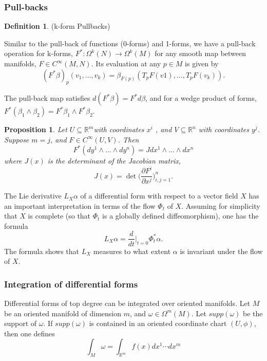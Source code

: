 \documentclass{article}
\newtheorem{proposition}{Proposition}[theorem]
\theoremstyle{definition}
\newtheorem{defn}[theorem]{Definition}
\newenvironment{definition}
  {\vspace{8pt}\begin{mdframed}[backgroundcolor=blueish]\begin{defn}}
  {\end{defn}\end{mdframed}\vspace{4pt}}
\begin{document}
\subsubsection{Pull-backs}

\begin{definition} (k-form Pullbacks)

Similar to the pull-back of functions (0-forms) and 1-forms, we have a pull-back operation for k-forms, $F^* : \Omega^k (N) \rightarrow \Omega^k (M)$ for any smooth map between manifolds, $F \in C^\infty(M,N)$. Its evaluation at any $p \in M$ is given by
\[
(F^* \beta )_p(v_1,\dots, v_k) = \beta_{F(p)} (T_pF(v1),\dots,T_pF(v_k)).
\]
\end{definition}

The pull-back map satisfies $d(F^*\beta) = F^*d\beta$, and for a wedge product of forms, $F^* (\beta_1 \wedge \beta_2) = F^* \beta_1 \wedge F^* \beta_2$.

\begin{proposition}

Let $U \subseteq \mathbb R^m $with coordinates $x^i$ , and $V \subseteq \mathbb R^n $ with coordinates $y^j $. Suppose $m = j$, and $F \in C^\infty(U,V)$. Then 
\[
F^* (dy^1 \wedge \dots \wedge dy^n ) = J dx^ 1 \wedge \dots \wedge dx^n
\]
where $J(x)$ is the determinant of the Jacobian matrix, 
\[
    J(x) = \det \bigg (\frac{\partial F^i}{\partial  x^j} \bigg ) ^n_{i, j=1}.
\]

\end{proposition}

The Lie derivative $L_X \alpha $ of a differential form with respect to a vector field $X$ has an important interpretation in terms of the flow $\Phi_t$ of $X$. Assuming for simplicity that $X$ is complete (so that $\Phi_t$ is a globally defined diffeomorphism), one has the formula 
\[
    L_X\alpha = \frac{d}{dt} \Bigr |_{t=0} \Phi^*_t \alpha.
\]
The formula shows that $L_X$ measures to what extent $\alpha$ is invariant under the flow of $X$.

\subsubsection{Integration of differential forms}

Differential forms of top degree can be integrated over oriented manifolds. Let $M$ be an oriented manifold of dimension $m$, and $\omega \in \Omega^m(M)$. Let $supp(\omega)$ be the support of $\omega$. If $supp(\omega)$ is contained in an oriented coordinate chart $(U,\phi)$, then one defines
\[
\int_M \omega = \int_{\mathbb R^m} f(x)dx^1\cdots dx^m 
\]
\end{document}
